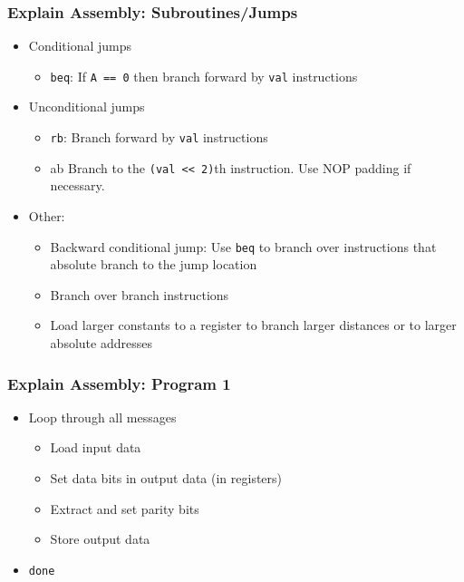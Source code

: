 	\begin{frame}
		\frametitle{Explain Assembly: Subroutines/Jumps}

		\begin{itemize}
			\item Conditional jumps
				\begin{itemize}
					\item \texttt{beq}: If \texttt{A == 0} then branch forward by \texttt{val} instructions
				\end{itemize}
			\item Unconditional jumps
				\begin{itemize}
					\item \texttt{rb}: Branch forward by \texttt{val} instructions
					\item {ab} Branch to the \texttt{(val << 2)}th instruction. Use NOP padding if necessary.
				\end{itemize}
			\item Other:
				\begin{itemize}
					\item Backward conditional jump: Use \texttt{beq} to branch over instructions that absolute branch to the jump location
					\item Branch over branch instructions
					\item Load larger constants to a register to branch larger distances or to larger absolute addresses
				\end{itemize}
		\end{itemize}
	\end{frame}

	\begin{frame}
		\frametitle{Explain Assembly: Program 1}
		\begin{itemize}
			\item Loop through all messages
				\begin{itemize}
					\item Load input data
					\item Set data bits in output data (in registers)
					\item Extract and set parity bits
					\item Store output data
				\end{itemize}
			\item \texttt{done}
		\end{itemize}
	\end{frame}

